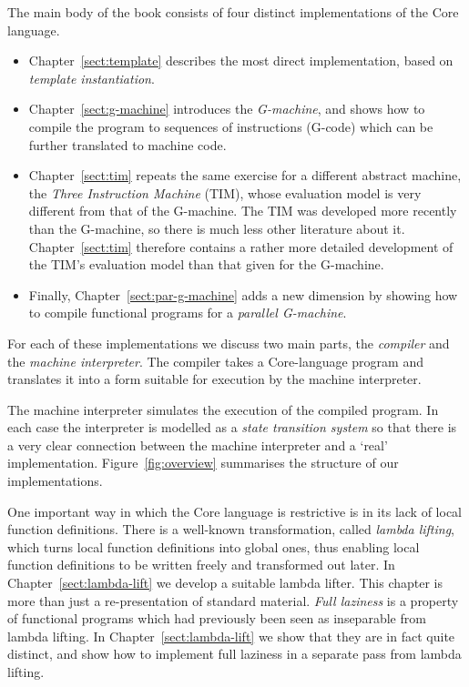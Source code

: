 The main body of the book consists of
four distinct implementations of the Core language.
\begin{itemize}
\item
Chapter~\ref{sect:template} describes the most direct implementation, based
on {\em template instantiation}.

\item
Chapter~\ref{sect:g-machine} introduces the {\em G-machine}, and
shows how to compile the program to
sequences of instructions (G-code) which can be further translated
to machine code.

\item
Chapter~\ref{sect:tim} repeats the same exercise for a different abstract
machine, the {\em Three Instruction Machine} (TIM),
whose evaluation model is very different from that of the G-machine.
The TIM was developed more recently than the G-machine, so there is
much less other literature about it.  Chapter~\ref{sect:tim} therefore
contains a rather more detailed development of the TIM's evaluation
model than that given for the G-machine.

\item
Finally, Chapter~\ref{sect:par-g-machine} adds a new dimension by showing how
to compile functional programs for a {\em parallel G-machine}.
\end{itemize}

For each of these implementations we discuss two main parts, the {\em compiler}
and the {\em machine interpreter}.
The compiler takes a Core-language program and translates it into a form
suitable for execution by the machine interpreter.

The machine interpreter simulates the execution of the compiled program.
In each case the interpreter
is modelled as a {\em state transition system} so that
there is a very clear connection between the machine interpreter and
a `real' implementation.
Figure~\ref{fig:overview} summarises the structure of our implementations.
\begin{figure*}

\caption{Overview of the implementations}
\label{fig:overview}
\end{figure*}

One important way in which the Core language is restrictive is
in its lack of local function definitions.  There is a well-known
transformation, called {\em lambda lifting}, which turns local function
definitions into global ones, thus enabling local function definitions to
be written freely and transformed out later.
In Chapter~\ref{sect:lambda-lift} we develop
a suitable lambda lifter.
This chapter is more than just a re-presentation of standard material.
{\em Full laziness} is a property of functional programs which had previously
been seen as inseparable from lambda lifting.  In Chapter~\ref{sect:lambda-lift}
we show that they are in fact quite distinct, and show how to implement
full laziness in a separate pass from lambda lifting.

